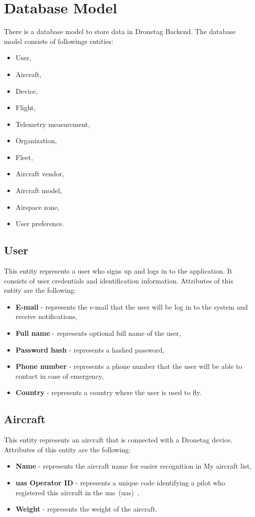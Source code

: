 \section{Database Model}\label{sec:database-model}
There is a database model to store data in Dronetag Backend.
The database model consists of followings entities:
\begin{itemize}
    \item User,
    \item Aircraft,
    \item Device,
    \item Flight,
    \item Telemetry measurement,
    \item Organization,
    \item Fleet,
    \item Aircraft vendor,
    \item Aircraft model,
    \item Airspace zone,
    \item User preference.
\end{itemize}

\subsection{User}\label{subsec:user}
This entity represents a user who signs up and logs in to the application.
It consists of user credentials and identification information.
Attributes of this entity are the following:
\begin{itemize}
    \item \textbf{E-mail} - represents the e-mail that the user will be log in to the system and receive notifications,
    \item \textbf{Full name} - represents optional full name of the user,
    \item \textbf{Password hash} - represents a hashed password,
    \item \textbf{Phone number} - represents a phone number that the user will be able to contact in case of emergency,
    \item \textbf{Country} - represents a country where the user is used to fly.
\end{itemize}

\subsection{Aircraft}\label{subsec:aircraft}
This entity represents an aircraft that is connected with a Dronetag device.
Attributes of this entity are the following:
\begin{itemize}
    \item \textbf{Name} - represents the aircraft name for easier recognition in My aircraft list,
    \item \textbf{\acrshort{uas} Operator ID} - represents a unique code identifying a pilot who registered this aircraft in the \acrshort{uas}~(\acrlong{uas})~\cite{uas},
    \item \textbf{Weight} - represents the weight of the aircraft.
\end{itemize}

